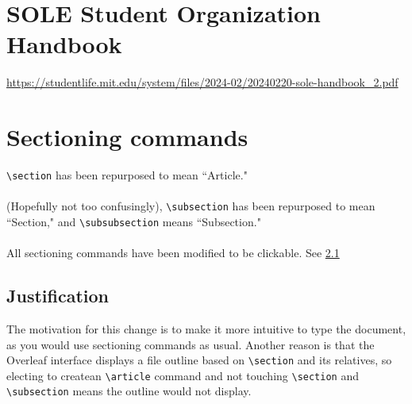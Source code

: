 \documentclass{constitution}
\begin{document}
\section{SOLE Student Organization Handbook}
\url{https://studentlife.mit.edu/system/files/2024-02/20240220-sole-handbook_2.pdf}

\section{Sectioning commands}
\verb|\section| has been repurposed to mean ``Article."
\\
\\
(Hopefully not too confusingly), \verb|\subsection| has been repurposed to mean ``Section," and \verb|\subsubsection| means ``Subsection."
\\
\\
All sectioning commands have been modified to be clickable.
See \ref{justification}

\subsection{Justification}
\label{justification}
The motivation for this change is to make it more intuitive to type the document, as you would use sectioning commands as usual.
Another reason is that the Overleaf interface displays a file outline based on \verb|\section| and its relatives, so electing to createan \verb|\article| command and not touching \verb|\section| and \verb|\subsection| means the outline would not display.
\end{document}
